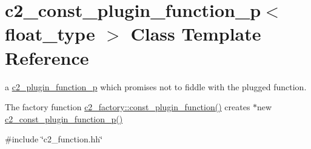 \hypertarget{classc2__const__plugin__function__p}{}\section{c2\+\_\+const\+\_\+plugin\+\_\+function\+\_\+p$<$ float\+\_\+type $>$ Class Template Reference}
\label{classc2__const__plugin__function__p}


a \hyperlink{classc2__plugin__function__p}{c2\+\_\+plugin\+\_\+function\+\_\+p} which promises not to fiddle with the plugged function.

The factory function \hyperlink{classc2__factory_aebeb20651a347e1fa8f14118faf2588e}{c2\+\_\+factory\+::const\+\_\+plugin\+\_\+function()} creates $\ast$new \hyperlink{classc2__const__plugin__function__p_a443dc7bcbdc6e458673b98aedf53ad56}{c2\+\_\+const\+\_\+plugin\+\_\+function\+\_\+p()}  




{\ttfamily \#include \char`\"{}c2\+\_\+function.\+hh\char`\"{}}



